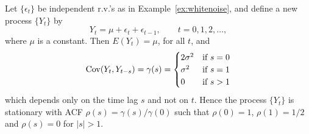 \begin{ex} \label{ex:movingaverage} Let $\{ \epsilon_t \}$ be independent r.v.'s as in Example~\ref{ex:whitenoise}, and define a new process $\{ Y_t \}$ by
	\[
	Y_t = \mu + \epsilon_t + \epsilon_{t-1}, \qquad t=0, 1, 2, \ldots,
	\]
where $\mu$ is a constant.  Then $E(Y_t)= \mu$, for all $t$, and
	\[
	\operatorname{Cov}(Y_t,Y_{t-s})= \gamma(s) =
	\begin{cases}
	2 \sigma^2 & \text{if } s= 0 \\
	\sigma^2 & \text{if } s= 1 \\
	0 & \text{if } s > 1
	\end{cases}
	\]
which depends only on the time lag $s$ and not on $t$.  Hence the process $\{ Y_t \}$ is stationary with ACF $\rho(s)= \gamma(s)/\gamma(0)$ such that $\rho(0)= 1$, $\rho(1)= 1/2$ and $\rho(s)= 0$ for $\lvert s \rvert > 1$.
 

\end{ex}

